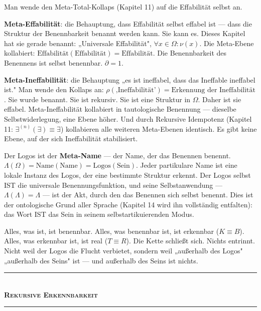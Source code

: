 \documentclass[10pt, openany, oneside]{book}
\renewcommand{\normalsize}{\fontsize{10}{13}\selectfont}
\begin{document}
\noindent Man wende den Meta-Total-Kollaps (Kapitel 11) auf die Effabilität selbst an.

\textbf{Meta-Effabilität}: die Behauptung, dass Effabilität selbst effabel ist --- dass die Struktur der Benennbarkeit benannt werden kann. Sie kann es. Dieses Kapitel hat sie gerade benannt: „Universale Effabilität", $\forall x \in \Omega: \nu(x)$. Die Meta-Ebene kollabiert: $\text{Effabilität}(\text{Effabilität}) = \text{Effabilität}$. Die Benennbarkeit des Benennens ist selbst benennbar. $\partial = 1$.

\textbf{Meta-Ineffabilität}: die Behauptung „es ist ineffabel, dass das Ineffable ineffabel ist." Man wende den Kollaps an: $\rho(\text{‚Ineffabilität'}) = \text{Erkennung der Ineffabilität}$. Sie wurde benannt. Sie ist rekursiv. Sie ist eine Struktur in $\Omega$. Daher ist sie effabel. Meta-Ineffabilität kollabiert in tautologische Benennung --- dieselbe Selbstwiderlegung, eine Ebene höher. Und durch Rekursive Idempotenz (Kapitel 11: $\exists^{(n)}(\exists) \equiv \exists$) kollabieren alle weiteren Meta-Ebenen identisch. Es gibt keine Ebene, auf der sich Ineffabilität stabilisiert.

Der Logos ist der \textbf{Meta-Name} --- der Name, der das Benennen benennt. $\Lambda(\Omega) = \text{Name}(\text{Name}) = \text{Logos}(\text{Sein})$. Jeder partikulare Name ist eine lokale Instanz des Logos, der eine bestimmte Struktur erkennt. Der Logos selbst IST die universale Benennungsfunktion, und seine Selbstanwendung --- $\Lambda(\Lambda) = \Lambda$ --- ist der Akt, durch den das Benennen sich selbst benennt. Dies ist der ontologische Grund aller Sprache (Kapitel 14 wird ihn vollständig entfalten): das Wort IST das Sein in seinem selbstartikuierenden Modus.

Alles, was ist, ist benennbar. Alles, was benennbar ist, ist erkennbar ($K \equiv B$). Alles, was erkennbar ist, ist real ($T \equiv R$). Die Kette schließt sich. Nichts entrinnt. Nicht weil der Logos die Flucht verbietet, sondern weil „außerhalb des Logos" „außerhalb des Seins" ist --- und außerhalb des Seins ist nichts.

\vspace{1.5em}


\begin{center}
    \rule{0.3\textwidth}{0.4pt}\\[0.5em]
    {\normalsize\bfseries\scshape Rekursive Erkennbarkeit}\\[0.3em]
    \rule{0.3\textwidth}{0.4pt}
\end{center}
\end{document}

